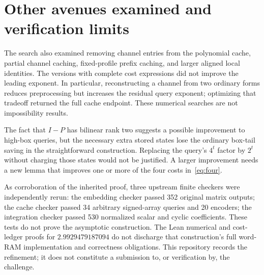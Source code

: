 \documentclass[11pt,a4paper]{article}
\begin{document}
\section{Other avenues examined and verification limits}
The search also examined removing channel entries from the polynomial
cache, partial channel caching, fixed-profile prefix caching, and larger
aligned local identities. The versions with complete cost expressions
did not improve the leading exponent. In particular, reconstructing a
channel from two ordinary forms reduces preprocessing but increases the
residual query exponent; optimizing that tradeoff returned the full
cache endpoint. These numerical searches are not impossibility results.

The fact that $I-P$ has bilinear rank two suggests a possible improvement
to high-box queries, but the necessary extra stored states lose the
ordinary box-tail saving in the straightforward construction. Replacing
the query's $4^t$ factor by $2^t$ without charging those states would
not be justified. A larger improvement needs a new lemma that improves
one or more of the four costs in~\eqref{eq:four}.

As corroboration of the inherited proof, three upstream finite checkers
were independently rerun: the embedding checker passed 352 original
matrix outputs; the cache checker passed 34 arbitrary signed-array
queries and 20 encoders; the integration checker passed 530 normalized
scalar and cyclic coefficients. These tests do not prove the
asymptotic construction. The Lean numerical and cost-ledger proofs for
$2.9929479187094$ do not discharge that construction's full word-RAM
implementation and correctness obligations.
This repository records the refinement; it does not
constitute a submission to, or verification by, the challenge.
\end{document}
